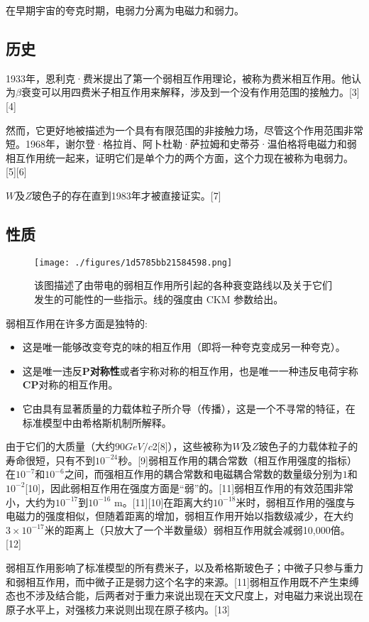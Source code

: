 在早期宇宙的夸克时期，电弱力分离为电磁力和弱力。

\subsection{历史}
1933年，恩利克·费米提出了第一个弱相互作用理论，被称为费米相互作用。他认为$\beta$衰变可以用四费米子相互作用来解释，涉及到一个没有作用范围的接触力。[3][4]

然而，它更好地被描述为一个具有有限范围的非接触力场，尽管这个作用范围非常短。1968年，谢尔登·格拉肖、阿卜杜勒·萨拉姆和史蒂芬·温伯格将电磁力和弱相互作用统一起来，证明它们是单个力的两个方面，这个力现在被称为电弱力。[5][6]

$W$及$Z$玻色子的存在直到1983年才被直接证实。[7]

\subsection{性质}
\begin{figure}[ht]
\centering
\texttt{[image: ./figures/1d5785bb21584598.png]}
\caption{该图描述了由带电的弱相互作用所引起的各种衰变路线以及关于它们发生的可能性的一些指示。线的强度由 CKM 参数给出。} \label{fig_RXHZY_2}
\end{figure}

弱相互作用在许多方面是独特的:
\begin{itemize}
\item 这是唯一能够改变夸克的味的相互作用（即将一种夸克变成另一种夸克）。
\item 这是唯一违反\textbf{P对称性}或者宇称对称的相互作用，也是唯一一种违反电荷宇称\textbf{CP}对称的相互作用。
\item 它由具有显著质量的力载体粒子所介导（传播），这是一个不寻常的特征，在标准模型中由希格斯机制所解释。
\end{itemize}
由于它们的大质量（大约$90 GeV/c$2[8]），这些被称为$W$及$Z$玻色子的力载体粒子的寿命很短，只有不到$10^{-24}$秒。[9]弱相互作用的耦合常数（相互作用强度的指标）在$10^{-7}$和$10^{-6}$之间，而强相互作用的耦合常数和电磁耦合常数的数量级分别为$1$和$10^{-2}$[10]，因此弱相互作用在强度方面是“弱”的。[11]弱相互作用的有效范围非常小，大约为$10^{-17}$到$10^{-16}$ m。[11][10]在距离大约$10^{-18}$米时，弱相互作用的强度与电磁力的强度相似，但随着距离的增加，弱相互作用开始以指数级减少，在大约$3\times10^{-17}$米的距离上（只放大了一个半数量级）弱相互作用就会减弱10,000倍。[12]

弱相互作用影响了标准模型的所有费米子，以及希格斯玻色子；中微子只参与重力和弱相互作用，而中微子正是弱力这个名字的来源。[11]弱相互作用既不产生束缚态也不涉及结合能，后两者对于重力来说出现在天文尺度上，对电磁力来说出现在原子水平上，对强核力来说则出现在原子核内。[13]

